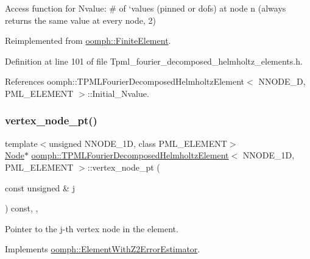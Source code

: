 Access function for Nvalue\+: \# of `values\textquotesingle{} (pinned or dofs) at node n (always returns the same value at every node, 2) 

Reimplemented from \hyperlink{classoomph_1_1FiniteElement_a56610c60d5bc2d7c27407a1455471b1a}{oomph\+::\+Finite\+Element}.



Definition at line 101 of file Tpml\+\_\+fourier\+\_\+decomposed\+\_\+helmholtz\+\_\+elements.\+h.



References oomph\+::\+T\+P\+M\+L\+Fourier\+Decomposed\+Helmholtz\+Element$<$ N\+N\+O\+D\+E\+\_\+D, P\+M\+L\+\_\+\+E\+L\+E\+M\+E\+N\+T $>$\+::\+Initial\+\_\+\+Nvalue.

\mbox{\label{classoomph_1_1TPMLFourierDecomposedHelmholtzElement_a1060503e32a25da08137cf9203dd721f}} 
\subsubsection{\texorpdfstring{vertex\+\_\+node\+\_\+pt()}{vertex\_node\_pt()}}
{\footnotesize\ttfamily template$<$unsigned N\+N\+O\+D\+E\+\_\+1D, class P\+M\+L\+\_\+\+E\+L\+E\+M\+E\+NT$>$ \\
\hyperlink{classoomph_1_1Node}{Node}$\ast$ \hyperlink{classoomph_1_1TPMLFourierDecomposedHelmholtzElement}{oomph\+::\+T\+P\+M\+L\+Fourier\+Decomposed\+Helmholtz\+Element}$<$ N\+N\+O\+D\+E\+\_\+1D, P\+M\+L\+\_\+\+E\+L\+E\+M\+E\+NT $>$\+::vertex\+\_\+node\+\_\+pt (\begin{DoxyParamCaption}\item[{const unsigned \&}]{j }\end{DoxyParamCaption}) const\hspace{0.3cm}{\ttfamily [inline]}, {\ttfamily [protected]}, {\ttfamily [virtual]}}



Pointer to the j-\/th vertex node in the element. 



Implements \hyperlink{classoomph_1_1ElementWithZ2ErrorEstimator_a0eedccc33519f852c5dc2055ddf2774b}{oomph\+::\+Element\+With\+Z2\+Error\+Estimator}.



